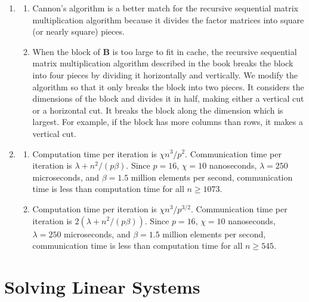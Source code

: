 \begin{enumerate}
\item \begin{enumerate}
      \item Cannon's algorithm is a better match for the recursive sequential
            matrix multiplication algorithm because it divides the factor
            matrices into square (or nearly square) pieces.
      \item When the block of {\bf B} is too large to
            fit in cache, the recursive sequential matrix multiplication
            algorithm described in the book breaks the block into four
            pieces by dividing it horizontally and vertically.
            We modify the algorithm so that it only breaks the block into
            two pieces. It considers the dimensions of the block and divides
            it in half, making either a vertical cut or a horizontal cut.
            It breaks the block along the dimension which is largest.
            For example, if the block has more columns than rows, it makes
            a vertical cut.
      \end{enumerate}

\item \begin{enumerate}
      \item Computation time per iteration is $\chi n^3/p^2$.
            Communication time per iteration is $\lambda + n^2/(p\beta)$.
            Since $p = 16$, $\chi = 10$ nanoseconds, $\lambda = 250$
            microseconds, and $\beta = 1.5$ million elements per second,
            communication time is less than computation time
            for all $n \ge 1073$.
      \item Computation time per iteration is $\chi n^3/p^{3/2}$.
            Communication time per iteration is $2(\lambda + n^2/(p\beta))$.
            Since $p = 16$, $\chi = 10$ nanoseconds, $\lambda = 250$
            microseconds, and $\beta = 1.5$ million elements per second,
            communication time is less than computation time
            for all $n \ge 545$.
      \end{enumerate}

\end{enumerate}

\chapter{Solving Linear Systems}

